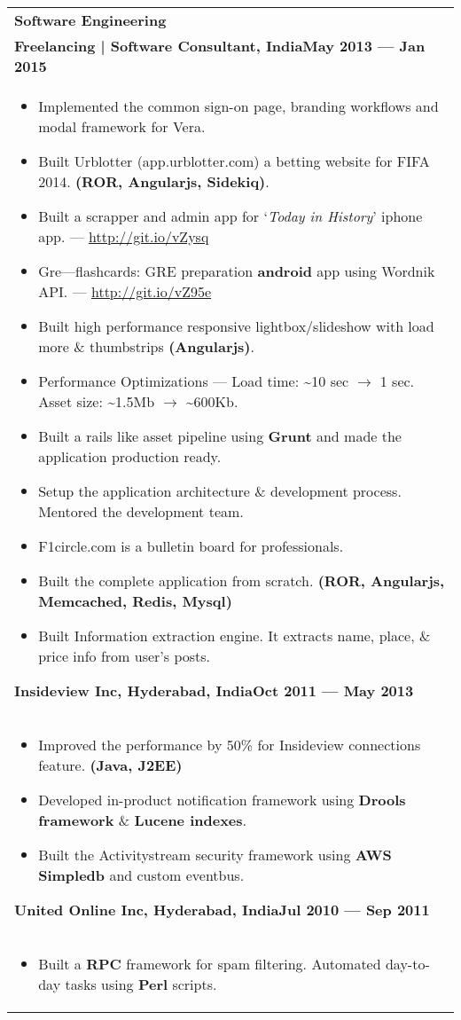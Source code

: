 \documentclass{article}
\begin{document}
\begin{tabular}{p{\dimexpr\linewidth-2\tabcolsep}}
    \bigskip
    \bfseries \large{Software Engineering}\\
    \smallskip
    {\bfseries Freelancing | Software Consultant, India\hfill May 2013 --- Jan 2015} \\
    \begin{itemize}
        \item Implemented the common sign-on page, branding workflows and modal framework for Vera.
        \item Built Urblotter (app.urblotter.com) a betting website for FIFA 2014. \textbf{(ROR, Angularjs, Sidekiq)}.
        \item Built a scrapper and admin app for `\textit{Today in History}' iphone app. --- \url{http://git.io/vZysq}
        \item Gre---flashcards: GRE preparation \textbf{android} app using Wordnik API\@. --- \url{http://git.io/vZ95e}
        \item Built high performance responsive lightbox/slideshow with load more \& thumbstrips \textbf{(Angularjs)}.
        \item Performance Optimizations --- Load time: \textasciitilde10 sec \( \rightarrow \) 1 sec.  
        Asset size: \textasciitilde1.5Mb \( \rightarrow \) \textasciitilde600Kb.
        \item Built a rails like asset pipeline using \textbf{Grunt} and made the application production ready.
        \item Setup the application architecture \& development process. Mentored the development team.
        \item F1circle.com is a bulletin board for professionals.
        \item Built the complete application from scratch. \textbf{(ROR, Angularjs, Memcached, Redis, Mysql)}
        \item Built Information extraction engine. It extracts name, place, \& price info from user's posts.
    \end{itemize}

    \bigskip
    {\bfseries Insideview Inc, Hyderabad, India\hfill Oct 2011 --- May 2013} \\
    \begin{itemize}
      \item Improved the performance by 50\% for Insideview connections feature. \textbf{(Java, J2EE)}
      \item Developed in-product notification framework using \textbf{Drools framework} \& \textbf{Lucene indexes}.
      \item Built the Activitystream security framework using \textbf{AWS Simpledb} and custom eventbus.
    \end{itemize}

    \bigskip
    {\bfseries United Online Inc, Hyderabad, India\hfill Jul 2010 --- Sep 2011} \\
    \begin{itemize}
      \item Built a \textbf{RPC} framework for spam filtering.  Automated day-to-day tasks using \textbf{Perl} scripts.
    \end{itemize}

\end{tabular}
\end{document}
